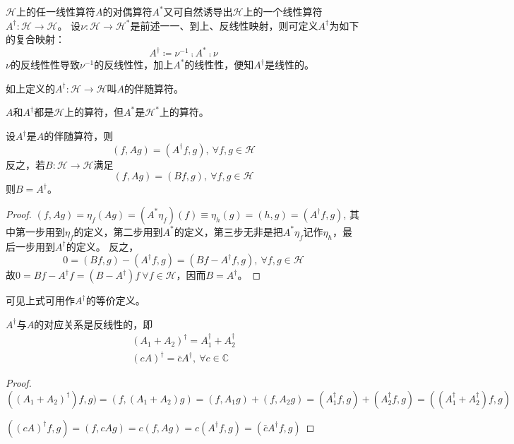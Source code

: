 $\mathscr{H}$上的任一线性算符$A$的对偶算符$A^*$又可自然诱导出$\mathscr{H}$上的一个线性算符$A^\dagger \colon \mathscr{H} \to \mathscr{H}$。
设$\nu \colon \mathscr{H} \to \mathscr{H}^*$是前述一一、到上、反线性映射，则可定义$A^\dagger$为如下的复合映射：
$$A^\dagger \coloneq \nu^{-1} \comp A^* \comp \nu$$
$\nu$的反线性性导致$\nu^{-1}$的反线性性，加上$A^*$的线性性，便知$A^\dagger$是线性的。

\begin{definition}
    如上定义的$A^\dagger \colon \mathscr{H} \to \mathscr{H}$叫$A$的伴随算符。
\end{definition}

\begin{note}
    $A$和$A^\dagger$都是$\mathscr{H}$上的算符，但$A^*$是$\mathscr{H}^*$上的算符。
\end{note}

\begin{theorem}
    设$A^\dagger$是$A$的伴随算符，则
    $$(f, Ag) = (A^\dagger f, g), ~ \forall f, g \in \mathscr{H}$$
    反之，若$B \colon \mathscr{H} \to \mathscr{H}$满足
    $$(f, Ag) = (Bf, g), ~ \forall f, g \in \mathscr{H}$$
    则$B = A^\dagger$。
\end{theorem}

\begin{proof}
    $(f, Ag) = \eta_f(Ag) = (A^*\eta_f)(f) \equiv \eta_h(g) = (h, g) = (A^\dagger f, g)$,
    其中第一步用到$\eta_f$的定义，第二步用到$A^*$的定义，第三步无非是把$A^*\eta_f$记作$\eta_h$，最后一步用到$A^\dagger$的定义。
    反之，
    $$0 = (Bf, g) - (A^\dagger f, g) = (Bf - A^\dagger f, g), ~ \forall f, g \in \mathscr{H}$$
    故$0 = Bf - A^\dagger f = (B - A^\dagger)f ~ \forall f \in \mathscr{H}$，因而$B = A^\dagger$。
\end{proof}

\begin{note}
    可见上式可用作$A^\dagger$的等价定义。
\end{note}

\begin{theorem}
    $A^\dagger$与$A$的对应关系是反线性的，即
    \[\begin{split}
        (A_1 + A_2)^\dagger = A_1^\dagger + A_2^\dagger \\
        (cA)^\dagger = \bar{c}A^\dagger, ~ \forall c \in \mathbb{C}
    \end{split}\]
\end{theorem}

\begin{proof}
    $((A_1 + A_2)^\dagger)f, g) = (f, (A_1 + A_2)g) = (f, A_1g) + (f, A_2g) = (A_1^\dagger f, g) + (A_2^\dagger f, g) = ((A_1^\dagger + A_2^\dagger)f, g)$
    
    $((cA)^\dagger f, g) = (f, cAg) = c(f, Ag) = c(A^\dagger f, g) = (\bar{c}A^\dagger f, g)$
\end{proof}

